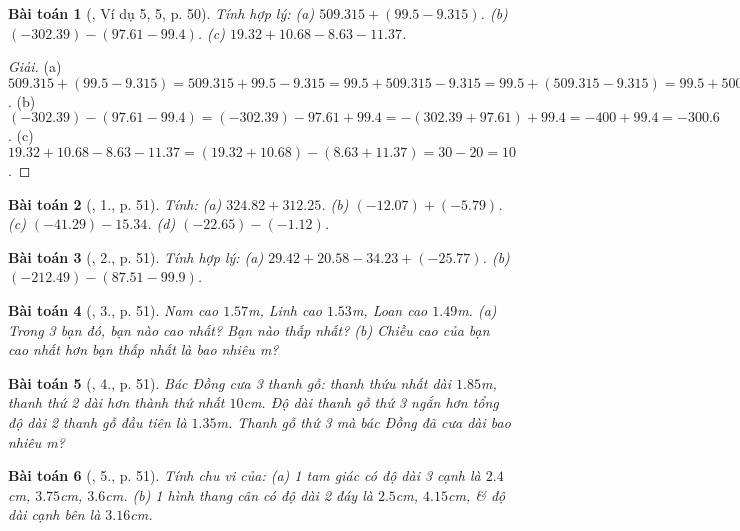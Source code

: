 \documentclass{article}
\newtheorem{baitoan}{Bài toán}
\begin{document}
\begin{baitoan}[\cite{SGK_Toan_6_Canh_Dieu_tap_2}, Ví dụ 5, 5, p. 50]
	Tính hợp lý: (a) $509.315 + (99.5 - 9.315)$. (b) $(-302.39) - (97.61 - 99.4)$. (c) $19.32 + 10.68 - 8.63 - 11.37$.
\end{baitoan}

\begin{proof}[Giải]
	(a) $509.315 + (99.5 - 9.315) = 509.315 + 99.5 - 9.315 = 99.5 + 509.315 - 9.315 = 99.5 + (509.315 - 9.315) = 99.5 + 500 = 599.5$. (b) $(-302.39) - (97.61 - 99.4) = (-302.39) - 97.61 + 99.4 = -(302.39 + 97.61) + 99.4 = -400 + 99.4 = -300.6$. (c) $19.32 + 10.68 - 8.63 - 11.37 = (19.32 + 10.68) - (8.63 + 11.37) = 30 - 20 = 10$.
\end{proof}

\begin{baitoan}[\cite{SGK_Toan_6_Canh_Dieu_tap_2}, 1., p. 51]
	Tính: (a) $324.82 + 312.25$. (b) $(-12.07) + (-5.79)$. (c) $(-41.29) - 15.34$. (d) $(-22.65) - (-1.12)$.
\end{baitoan}

\begin{baitoan}[\cite{SGK_Toan_6_Canh_Dieu_tap_2}, 2., p. 51]
	Tính hợp lý: (a) $29.42 + 20.58 - 34.23 + (-25.77)$. (b) $(-212.49) - (87.51 - 99.9)$.
\end{baitoan}

\begin{baitoan}[\cite{SGK_Toan_6_Canh_Dieu_tap_2}, 3., p. 51]
	Nam cao $1.57$\emph{m}, Linh cao $1.53$\emph{m}, Loan cao $1.49$\emph{m}. (a) Trong 3 bạn đó, bạn nào cao nhất? Bạn nào thấp nhất? (b) Chiều cao của bạn cao nhất hơn bạn thấp nhất là bao nhiêu \emph{m}?
\end{baitoan}

\begin{baitoan}[\cite{SGK_Toan_6_Canh_Dieu_tap_2}, 4., p. 51]
	Bác Đồng cưa 3 thanh gỗ: thanh thứu nhất dài $1.85$\emph{m}, thanh thứ 2 dài hơn thành thứ nhất $10$\emph{cm}. Độ dài thanh gỗ thứ 3 ngắn hơn tổng độ dài 2 thanh gỗ đầu tiên là $1.35$\emph{m}. Thanh gỗ thứ 3 mà bác Đồng đã cưa dài bao nhiêu \emph{m}?
\end{baitoan}

\begin{baitoan}[\cite{SGK_Toan_6_Canh_Dieu_tap_2}, 5., p. 51]
	Tính chu vi của: (a) 1 tam giác có độ dài 3 cạnh là $2.4$\emph{cm}, $3.75$\emph{cm}, $3.6$\emph{cm}. (b) 1 hình thang cân có độ dài 2 đáy là $2.5$\emph{cm}, $4.15$\emph{cm}, \& độ dài cạnh bên là $3.16$\emph{cm}.
\end{baitoan}
\end{document}
